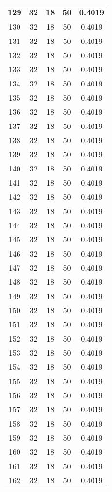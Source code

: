 \documentclass[letterpaper, 12pt]{article}
\begin{document}
\begin{longtable}{|c|c|c|c|c|}
\hline
129 & 32 & 18 & 50 & 0.4019 \\
\hline
130 & 32 & 18 & 50 & 0.4019 \\
\hline
131 & 32 & 18 & 50 & 0.4019 \\
\hline
132 & 32 & 18 & 50 & 0.4019 \\
\hline
133 & 32 & 18 & 50 & 0.4019 \\
\hline
134 & 32 & 18 & 50 & 0.4019 \\
\hline
135 & 32 & 18 & 50 & 0.4019 \\
\hline
136 & 32 & 18 & 50 & 0.4019 \\
\hline
137 & 32 & 18 & 50 & 0.4019 \\
\hline
138 & 32 & 18 & 50 & 0.4019 \\
\hline
139 & 32 & 18 & 50 & 0.4019 \\
\hline
140 & 32 & 18 & 50 & 0.4019 \\
\hline
141 & 32 & 18 & 50 & 0.4019 \\
\hline
142 & 32 & 18 & 50 & 0.4019 \\
\hline
143 & 32 & 18 & 50 & 0.4019 \\
\hline
144 & 32 & 18 & 50 & 0.4019 \\
\hline
145 & 32 & 18 & 50 & 0.4019 \\
\hline
146 & 32 & 18 & 50 & 0.4019 \\
\hline
147 & 32 & 18 & 50 & 0.4019 \\
\hline
148 & 32 & 18 & 50 & 0.4019 \\
\hline
149 & 32 & 18 & 50 & 0.4019 \\
\hline
150 & 32 & 18 & 50 & 0.4019 \\
\hline
151 & 32 & 18 & 50 & 0.4019 \\
\hline
152 & 32 & 18 & 50 & 0.4019 \\
\hline
153 & 32 & 18 & 50 & 0.4019 \\
\hline
154 & 32 & 18 & 50 & 0.4019 \\
\hline
155 & 32 & 18 & 50 & 0.4019 \\
\hline
156 & 32 & 18 & 50 & 0.4019 \\
\hline
157 & 32 & 18 & 50 & 0.4019 \\
\hline
158 & 32 & 18 & 50 & 0.4019 \\
\hline
159 & 32 & 18 & 50 & 0.4019 \\
\hline
160 & 32 & 18 & 50 & 0.4019 \\
\hline
161 & 32 & 18 & 50 & 0.4019 \\
\hline
162 & 32 & 18 & 50 & 0.4019 \\

\end{longtable}
\end{document}
